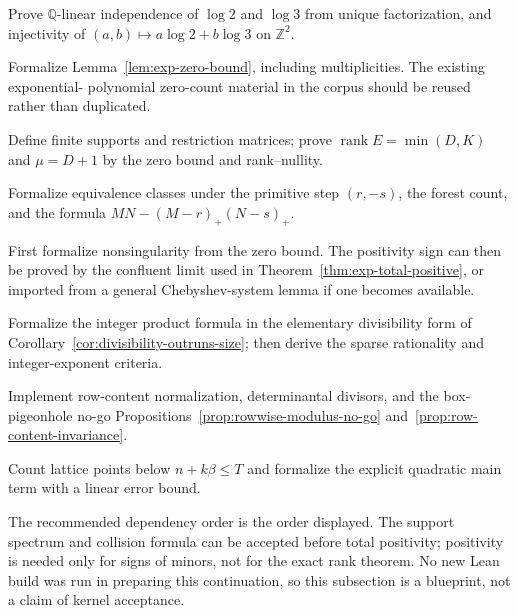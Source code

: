 \documentclass[11pt,oneside]{article}
\theoremstyle{definition}
\theoremstyle{remark}
\newcommand{\Z}{\mathbb Z}
\newcommand{\Q}{\mathbb Q}
\newcommand{\lean}[1]{\texttt{\detokenize{#1}}}
\newcommand{\rank}{\operatorname{rank}}
\begin{document}
\begin{description}[leftmargin=4.2cm,style=nextline,itemsep=0.7em]
\item[\lean{OrbitFrequencies.lean}]
Prove $\Q$-linear independence of $\log2$ and $\log3$ from unique factorization, and injectivity
of $(a,b)\mapsto a\log2+b\log3$ on $\Z^2$.

\item[\lean{ExponentialChebyshev.lean}]
Formalize Lemma~\ref{lem:exp-zero-bound}, including multiplicities.  The existing exponential-
polynomial zero-count material in the corpus should be reused rather than duplicated.

\item[\lean{OrbitSupportSpectrum.lean}]
Define finite supports and restriction matrices; prove
$\rank E=\min(D,K)$ and $\mu=D+1$ by the zero bound and rank--nullity.

\item[\lean{RationalGridCollisions.lean}]
Formalize equivalence classes under the primitive step $(r,-s)$, the forest count, and the
formula $MN-(M-r)_+(N-s)_+$.

\item[\lean{ExponentialTotalPositivity.lean}]
First formalize nonsingularity from the zero bound.  The positivity sign can then be proved by
the confluent limit used in Theorem~\ref{thm:exp-total-positive}, or imported from a general
Chebyshev-system lemma if one becomes available.

\item[\lean{AdelicSparseCertificate.lean}]
Formalize the integer product formula in the elementary divisibility form of
Corollary~\ref{cor:divisibility-outruns-size}; then derive the sparse rationality and
integer-exponent criteria.

\item[\lean{PrimitiveEvaluationMatrix.lean}]
Implement row-content normalization, determinantal divisors, and the box-pigeonhole no-go
Propositions~\ref{prop:rowwise-modulus-no-go} and~\ref{prop:row-content-invariance}.

\item[\lean{OrbitPointCountingLower.lean}]
Count lattice points below $n+k\beta\le T$ and formalize the explicit quadratic main term with
a linear error bound.
\end{description}

The recommended dependency order is the order displayed.  The support spectrum and collision
formula can be accepted before total positivity; positivity is needed only for signs of
minors, not for the exact rank theorem.  No new Lean build was run in preparing this
continuation, so this subsection is a blueprint, not a claim of kernel acceptance.
\end{document}
